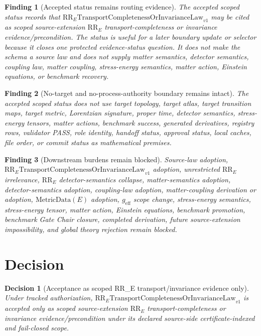 \documentclass[11pt]{article}
\newcommand{\RRE}{\mathrm{RR}_{E}}
\newcommand{\LawRR}{\mathrm{RR}_{E}\mathrm{TransportCompletenessOrInvarianceLaw}_{v1}}
\newcommand{\MetricData}{\mathrm{MetricData}}
\newcommand{\geff}{g_{\mathrm{eff}}}
\newtheorem{decision}{Decision}
\newtheorem{finding}{Finding}
\begin{document}
\begin{finding}[Accepted status remains routing evidence]
The accepted scoped status records that \(\LawRR\) may be cited as scoped
source-extension \(\RRE\) transport-completeness or invariance
evidence/precondition. The status is useful for a later boundary update or
selector because it closes one protected evidence-status question. It does not
make the schema a source law and does not supply matter semantics, detector
semantics, coupling law, matter coupling, stress-energy semantics, matter
action, Einstein equations, or benchmark recovery.
\end{finding}

\begin{finding}[No-target and no-process-authority boundary remains intact]
The accepted scoped status does not use target topology, target atlas, target
transition maps, target metric, Lorentzian signature, proper time, detector
semantics, stress-energy tensors, matter actions, benchmark success,
generated derivatives, registry rows, validator PASS, role identity, handoff
status, approval status, local caches, file order, or commit status as
mathematical premises.
\end{finding}

\begin{finding}[Downstream burdens remain blocked]
Source-law adoption, \(\LawRR\) adoption, unrestricted \(\RRE\) irrelevance,
\(\RRE\) detector-semantics collapse, matter-semantics adoption,
detector-semantics adoption, coupling-law adoption, matter-coupling
derivation or adoption, \(\MetricData(E)\) adoption, \(\geff\) scope change,
stress-energy semantics, stress-energy tensor, matter action, Einstein
equations, benchmark promotion, benchmark Gate Chair closure, completed
derivation, future source-extension impossibility, and global theory
rejection remain blocked.
\end{finding}

\section{Decision}

\begin{decision}[Acceptance as scoped RR\_E transport/invariance evidence only]
Under tracked authorization, \(\LawRR\) is accepted only as scoped
source-extension \(\RRE\) transport-completeness or invariance
evidence/precondition under its declared source-side certificate-indexed and
fail-closed scope.
\end{decision}
\end{document}
